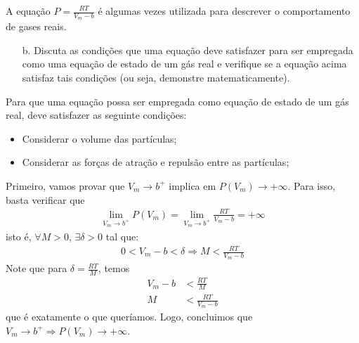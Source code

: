 \begin{xcs}
    A equação \( P = \frac{RT}{V_m - b} \) é algumas vezes utilizada para
    descrever o comportamento de gases reais. 
    \begin{enumerate}[label=\alph*.]
        \item[b.] Discuta as condições que uma equação deve satisfazer para ser
            empregada como uma equação de estado de um gás real e verifique se a
            equação acima satisfaz tais condições (ou seja, demonstre
            matematicamente). 
    \end{enumerate}
\end{xcs}
\begin{rsl}
    Para que uma equação possa ser empregada como equação de estado de um gás real,
    deve satisfazer as seguinte condições:
    \begin{itemize} %
        \item Considerar o volume das partículas;
        \item Considerar as forças de atração e repulsão entre as partículas;
    \end{itemize}
    Primeiro, vamos provar que \( V_m \to b^+ \) implica em \( P(V_m) \to +\infty \).
    Para isso, basta verificar que 
    \begin{align*}
        \lim_{V_m \to b^+} P(V_m) = \lim_{V_m \to b^+} \frac{RT}{V_m-b} = +\infty
    \end{align*}
    isto é, \( \forall M > 0 \), \( \exists \delta > 0 \) tal que:
    \begin{align*}
        0 < V_m - b < \delta \Rightarrow M < \frac{RT}{V_m-b}
    \end{align*}
    Note que para \( \delta = \frac{RT}{M} \), temos
    \begin{align*}
        V_m - b &< \frac{RT}{M}\\
        M &< \frac{RT}{V_m - b} 
    \end{align*}
    que é exatamente o que queríamos. Logo, concluimos que \( V_m \to b^+
    \Rightarrow P(V_m) \to +\infty \).


\end{rsl}
